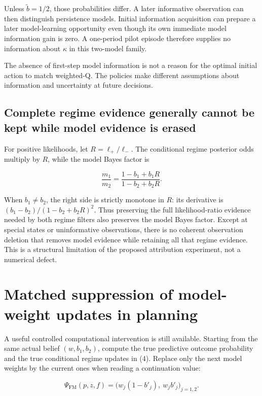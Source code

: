 \documentclass[10pt,a4paper]{article}
\begin{document}
Unless $\widetilde b=1/2$, those probabilities differ. A later informative
observation can then distinguish persistence models. Initial information
acquisition can prepare a later model-learning opportunity even though its
own immediate model information gain is zero. A one-period pilot episode
therefore supplies no information about $\kappa$ in this two-model family.

The absence of first-step model information is not a reason for the optimal
initial action to match weighted-Q. The policies make different assumptions
about information and uncertainty at future decisions.

\subsection{Complete regime evidence generally cannot be kept while model evidence is erased}

For positive likelihoods, let $R=\ell_+/\ell_-$. The conditional regime
posterior odds multiply by $R$, while the model Bayes factor is

\begin{equation}
\frac{m_1}{m_2}
=\frac{1-b_1+b_1R}{1-b_2+b_2R}.
\tag{22}
\end{equation}

When $b_1\ne b_2$, the right side is strictly monotone in $R$: its
derivative is $(b_1-b_2)/(1-b_2+b_2R)^2$. Thus preserving the full
likelihood-ratio evidence needed by both regime filters also preserves the
model Bayes factor. Except at special states or uninformative observations,
there is no coherent observation deletion that removes model evidence while
retaining all that regime evidence. This is a structural limitation of the
proposed attribution experiment, not a numerical defect.

\section{Matched suppression of model-weight updates in planning}

A useful controlled computational intervention is still available. Starting
from the same actual belief $(w,b_1,b_2)$, compute the true predictive outcome
probability and the true conditional regime updates in (4). Replace only the
next model weights by the current ones when reading a continuation value:

\begin{equation}
\Psi_{\mathrm{FM}}(p,z,f)
=\big(w_j(1-b'_j),\ w_jb'_j\big)_{j=1,2}.
\tag{23}
\end{equation}
\end{document}
